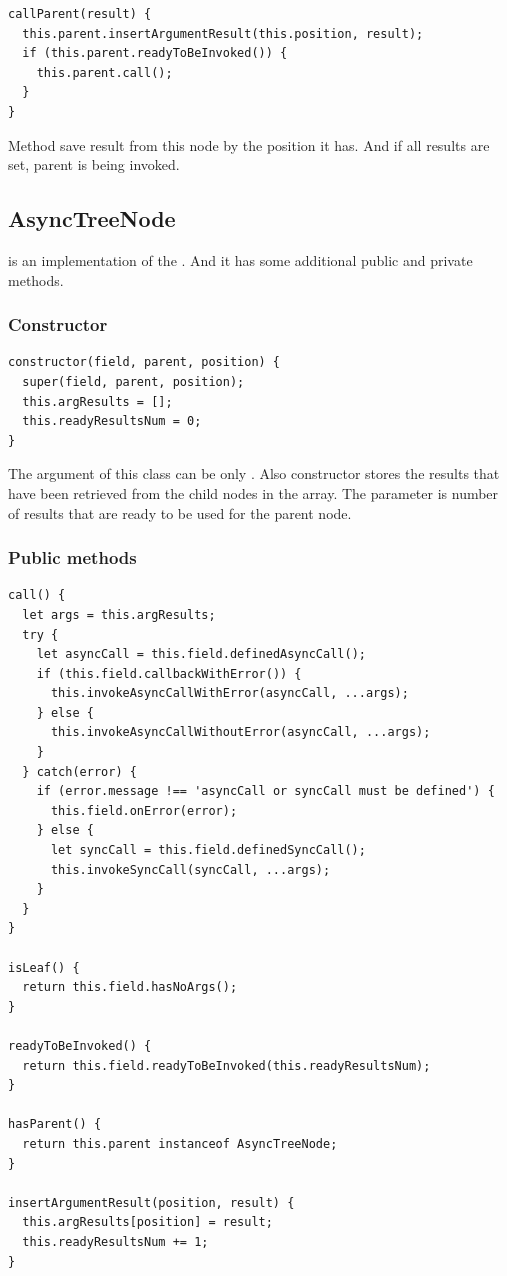 \documentclass{article}
\newcommand{\cit}[1]{{\fontfamily{qcr}\selectfont{\textcolor{superdarkgray}{#1}}}}
\begin{document}
\begin{lstlisting}
callParent(result) {
  this.parent.insertArgumentResult(this.position, result);
  if (this.parent.readyToBeInvoked()) {
    this.parent.call();
  }
}
\end{lstlisting}

Method \cit{callParent} save result from this node by the position it has. And if all results are set, parent is being invoked.

\vspace*{10px}

\subsection{AsyncTreeNode}

\cit{AsyncTreeNode} is an implementation of the \cit{TreeNode}. And it has some additional public and private methods.

\subsubsection{Constructor}

\begin{lstlisting}
constructor(field, parent, position) {
  super(field, parent, position);
  this.argResults = [];
  this.readyResultsNum = 0;
}
\end{lstlisting}

The argument \cit{field} of this class can be only \cit{AsyncObject}. Also constructor stores the results that have been retrieved from the child nodes in the \cit{argResults} array. The parameter \cit{readResultsNum} is number of results that are ready to be used for the parent node.

\vspace*{10px}

\subsubsection{Public methods}

\begin{lstlisting}
call() {
  let args = this.argResults;
  try {
    let asyncCall = this.field.definedAsyncCall();
    if (this.field.callbackWithError()) {
      this.invokeAsyncCallWithError(asyncCall, ...args);
    } else {
      this.invokeAsyncCallWithoutError(asyncCall, ...args);
    }
  } catch(error) {
    if (error.message !== 'asyncCall or syncCall must be defined') {
      this.field.onError(error);
    } else {
      let syncCall = this.field.definedSyncCall();
      this.invokeSyncCall(syncCall, ...args);
    }
  }
}

isLeaf() {
  return this.field.hasNoArgs();
}

readyToBeInvoked() {
  return this.field.readyToBeInvoked(this.readyResultsNum);
}

hasParent() {
  return this.parent instanceof AsyncTreeNode;
}

insertArgumentResult(position, result) {
  this.argResults[position] = result;
  this.readyResultsNum += 1;
}
\end{lstlisting}
\end{document}
